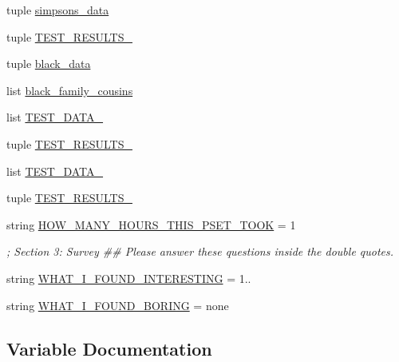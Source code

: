 \begin{DoxyCompactItemize}
tuple \hyperlink{namespacelab1_af339432da6bd451c07808024dae9fc1b}{simpsons\+\_\+data}
\item 
tuple \hyperlink{namespacelab1_a1337489874302ba903588b64b2d578ad}{T\+E\+S\+T\+\_\+\+R\+E\+S\+U\+L\+T\+S\+\_}
\item 
tuple \hyperlink{namespacelab1_a8717d4ee063423939345a9b9089bbbee}{black\+\_\+data}
\item 
list \hyperlink{namespacelab1_a57fa573631e1075c1d6127a56aee196b}{black\+\_\+family\+\_\+cousins}
\item 
list \hyperlink{namespacelab1_aed2d020dbfee204727220a36741309e5}{T\+E\+S\+T\+\_\+\+D\+A\+T\+A\+\_}
\item 
tuple \hyperlink{namespacelab1_a12138b8a907a9039b6a801459bef9663}{T\+E\+S\+T\+\_\+\+R\+E\+S\+U\+L\+T\+S\+\_}
\item 
list \hyperlink{namespacelab1_a126ca68dba8f47fc90c7863daf3e1ce2}{T\+E\+S\+T\+\_\+\+D\+A\+T\+A\+\_}
\item 
tuple \hyperlink{namespacelab1_a480d9e2bd857c96c33bcb061723a5d65}{T\+E\+S\+T\+\_\+\+R\+E\+S\+U\+L\+T\+S\+\_}
\item 
string \hyperlink{namespacelab1_afe738a1054db3ebcdc4894cb30305608}{H\+O\+W\+\_\+\+M\+A\+N\+Y\+\_\+\+H\+O\+U\+R\+S\+\_\+\+T\+H\+I\+S\+\_\+\+P\+S\+E\+T\+\_\+\+T\+O\+O\+K} = \textquotesingle{}1\textquotesingle{}
\begin{DoxyCompactList}\small\item\em ; Section 3\+: Survey \#\# Please answer these questions inside the double quotes. \end{DoxyCompactList}\item 
string \hyperlink{namespacelab1_a114faf39b7ac83b31a1b783d7263281c}{W\+H\+A\+T\+\_\+\+I\+\_\+\+F\+O\+U\+N\+D\+\_\+\+I\+N\+T\+E\+R\+E\+S\+T\+I\+N\+G} = \textquotesingle{}1..\textquotesingle{}
\item 
string \hyperlink{namespacelab1_a94d8fb89809d33d8772ac1e6346b9df9}{W\+H\+A\+T\+\_\+\+I\+\_\+\+F\+O\+U\+N\+D\+\_\+\+B\+O\+R\+I\+N\+G} = \textquotesingle{}none\textquotesingle{}
\end{DoxyCompactItemize}


\subsection{Variable Documentation}
\hypertarget{namespacelab1_a3549387a1205d37c768ff759e086ae66}{}
